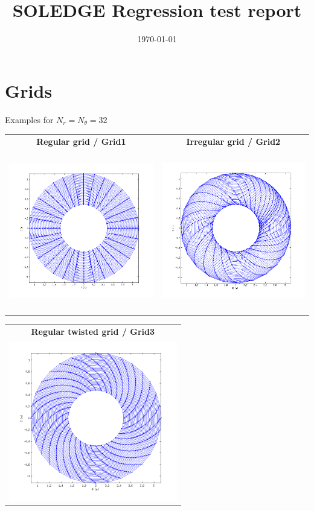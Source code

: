\documentclass[a4paper,11pts]{report}
\begin{document}
\title{SOLEDGE Regression test report}
\date{\today}
\maketitle

\chapter*{Grids}
Examples for $N_r=N_\theta=32$
\begin{table}[!h]
\centering
\begin{tabular}{cc}
  \textbf{Regular grid / Grid1} &   \textbf{Irregular grid / Grid2} \\
\includegraphics[height=7cm]{grids/regular.png} & \includegraphics[height=7cm]{grids/irregular.png}
\end{tabular}
\end{table}
\begin{table}[!h]
\centering
\begin{tabular}{c}
  \textbf{Regular twisted grid / Grid3}  \\
\includegraphics[height=7cm]{grids/regular_twist.png} 
\end{tabular}
\end{table}
\end{document}
